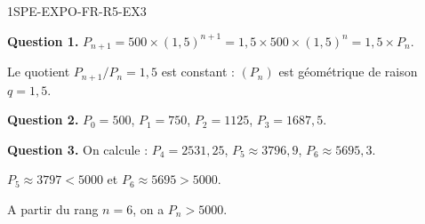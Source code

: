 

\begin{corrige}{1SPE-EXPO-FR-R5-EX3}

\textbf{Question 1.} $P_{n+1} = 500 \times (1{,}5)^{n+1} = 1{,}5 \times 500 \times (1{,}5)^n = 1{,}5 \times P_n$.

Le quotient $P_{n+1}/P_n = 1{,}5$ est constant : $(P_n)$ est géométrique de raison $q = 1{,}5$.

\textbf{Question 2.}
$P_0 = 500$, $P_1 = 750$, $P_2 = 1125$, $P_3 = 1687{,}5$.


\textbf{Question 3.} On calcule :
$P_4 = 2531{,}25$, $P_5 \approx 3796{,}9$, $P_6 \approx 5695{,}3$.

$P_5 \approx 3797 < 5000$ et $P_6 \approx 5695 > 5000$.

A partir du rang $n = 6$, on a $P_n > 5000$.

\end{corrige}
